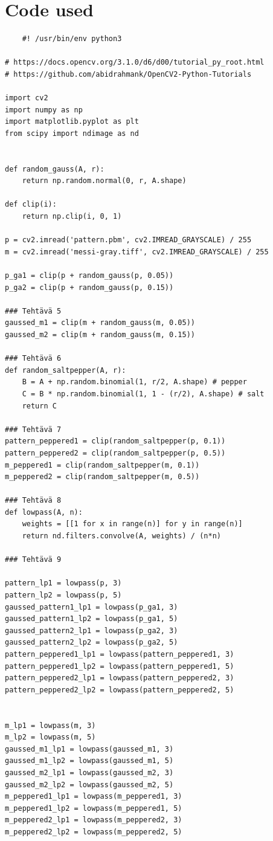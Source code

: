 \documentclass{article}
\begin{document}
    \section{Code used}
\begin{verbatim}
    #! /usr/bin/env python3

# https://docs.opencv.org/3.1.0/d6/d00/tutorial_py_root.html
# https://github.com/abidrahmank/OpenCV2-Python-Tutorials

import cv2
import numpy as np
import matplotlib.pyplot as plt
from scipy import ndimage as nd


def random_gauss(A, r):
    return np.random.normal(0, r, A.shape)

def clip(i):
    return np.clip(i, 0, 1)

p = cv2.imread('pattern.pbm', cv2.IMREAD_GRAYSCALE) / 255
m = cv2.imread('messi-gray.tiff', cv2.IMREAD_GRAYSCALE) / 255

p_ga1 = clip(p + random_gauss(p, 0.05))
p_ga2 = clip(p + random_gauss(p, 0.15))

### Tehtävä 5
gaussed_m1 = clip(m + random_gauss(m, 0.05))
gaussed_m2 = clip(m + random_gauss(m, 0.15))

### Tehtävä 6
def random_saltpepper(A, r):
    B = A + np.random.binomial(1, r/2, A.shape) # pepper
    C = B * np.random.binomial(1, 1 - (r/2), A.shape) # salt
    return C

### Tehtävä 7
pattern_peppered1 = clip(random_saltpepper(p, 0.1))
pattern_peppered2 = clip(random_saltpepper(p, 0.5))
m_peppered1 = clip(random_saltpepper(m, 0.1))
m_peppered2 = clip(random_saltpepper(m, 0.5))

### Tehtävä 8
def lowpass(A, n):
    weights = [[1 for x in range(n)] for y in range(n)]
    return nd.filters.convolve(A, weights) / (n*n)

### Tehtävä 9

pattern_lp1 = lowpass(p, 3)
pattern_lp2 = lowpass(p, 5)
gaussed_pattern1_lp1 = lowpass(p_ga1, 3)
gaussed_pattern1_lp2 = lowpass(p_ga1, 5)
gaussed_pattern2_lp1 = lowpass(p_ga2, 3)
gaussed_pattern2_lp2 = lowpass(p_ga2, 5)
pattern_peppered1_lp1 = lowpass(pattern_peppered1, 3) 
pattern_peppered1_lp2 = lowpass(pattern_peppered1, 5) 
pattern_peppered2_lp1 = lowpass(pattern_peppered2, 3) 
pattern_peppered2_lp2 = lowpass(pattern_peppered2, 5) 


m_lp1 = lowpass(m, 3)
m_lp2 = lowpass(m, 5)
gaussed_m1_lp1 = lowpass(gaussed_m1, 3)
gaussed_m1_lp2 = lowpass(gaussed_m1, 5)
gaussed_m2_lp1 = lowpass(gaussed_m2, 3)
gaussed_m2_lp2 = lowpass(gaussed_m2, 5)
m_peppered1_lp1 = lowpass(m_peppered1, 3) 
m_peppered1_lp2 = lowpass(m_peppered1, 5) 
m_peppered2_lp1 = lowpass(m_peppered2, 3) 
m_peppered2_lp2 = lowpass(m_peppered2, 5) 


\end{verbatim}
\end{document}
